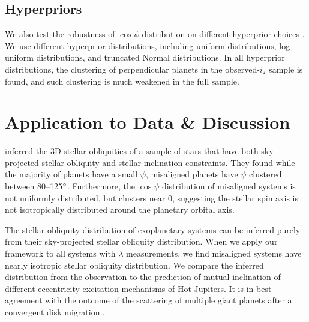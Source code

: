 \documentclass[twocolumn,times]{aastex631}
\begin{document}
\subsection{Hyperpriors}
We also test the robustness of $\cos{\psi}$ distribution on different hyperprior choices \citep[see a nice summary in][]{Nagpal22}. We use different hyperprior distributions, including uniform distributions, log uniform distributions, and truncated Normal distributions. In all hyperprior distributions, the clustering of perpendicular planets in the observed-$i_\star$ sample is found, and such clustering is much weakened in the full sample.

\section{Application to Data \& Discussion}\label{sec:data}

\cite{Albrecht21} inferred the 3D stellar obliquities of a sample of stars that have both sky-projected stellar obliquity and stellar inclination constraints. They found while the majority of planets have a small $\psi$, misaligned planets have $\psi$ clustered between 80--125$\mbox{$^\circ$}$. Furthermore, the $\cos{\psi}$ distribution of misaligned systems is not uniformly distributed, but clusters near 0, suggesting the stellar spin axis is not isotropically distributed around the planetary orbital axis.

The stellar obliquity distribution of exoplanetary systems can be inferred purely from their sky-projected stellar obliquity distribution. When we apply our framework to all systems with $\lambda$ measurements, we find misaligned systems have nearly isotropic stellar obliquity distribution. We compare the inferred distribution from the observation to the prediction of mutual inclination of different eccentricity excitation mechanisms of Hot Jupiters. It is in best agreement with the outcome of the scattering of multiple giant planets after a convergent disk migration \citep{Beague12}.


\end{document}
